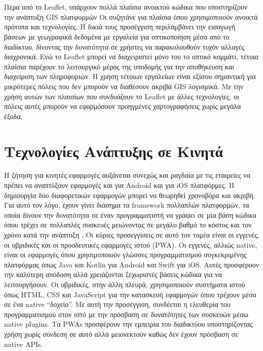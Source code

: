 \\
\\
Πέρα από το Leaflet, υπάρχουν πολλά πλαίσια ανοικτού κώδικα που υποστηρίζουν την ανάπτυξη GIS πλατφορμών Οι \textcite{sejati2020open} συζητάνε για πλαίσια όπου χρησιμοποιούν ανοικτά πρότυπα και τεχνολογίες. Η δικιά τους προσέγγιση περιλαμβάνει την εισαγωγή βάσεων με γεωγραφικά δεδομένα με εργαλεία για οπτικοποίηση μέσα από το διαδίκτυο, δίνοντας την δυνατότητα σε χρήστες να παρακολουθούν τυχόν αλλαγές διαχρονικά. Ενώ το Leaflet μπορεί να διαχειριστεί μόνο του το οπτικό κομμάτι, τέτοια πλαίσια παρέχουν το λειτουργικό μέρος της υποδομής για την αποθήκευση και διαχείριση των πληροφοριών. Η χρήση τέτοιων εργαλείων είναι εξίσου σημαντική για μικρότερες πόλεις που δεν μπορούν να διαθέσουν ακριβά GIS λογισμικά. Με την χρήση αυτών των πλαισίων που συνδυάζουν το Leaflet με άλλες τεχνολογίες, οι πόλεις αυτές μπορούν να εφαρμόσουν προηγμένες χαρτογραφήσεις χωρίς μεγάλα έξοδα.
\\
\section{Τεχνολογίες Ανάπτυξης σε Κινητά}
Η ζήτηση για κινητές εφαρμογές αυξάνεται συνεχώς και ραγδαία με τις εταιρείες να πρέπει να αναπτύξουν εφαρμογές και για Android και για iOS πλατφόρμες. Η δημιουργία δύο διαφορετικών εφαρμογών μπορεί να θεωρηθεί χρονοβόρα και ακριβή. Για αυτό τον λόγο, έχουν γίνει διάσημα τα framework πολλαπλών πλατφορμών, τα οποία δίνουν την δυνατότητα σε έναν προγραμματιστή να γράψει σε μία βάση κώδικα όπου τρέχει σε πολλαπλές συσκευές μειώνοντας σε μεγάλο βαθμό το κόστος και τον χρόνο κατά την ανάπτυξη \parencite{majchrzak2017comprehensive}. Οι κύριες προσεγγίσεις σε αυτό τον τομέα είναι οι εγγενές, οι υβριδικές και οι προοδευτικές εφαρμογές ιστού (PWA). Οι εγγενές, αλλιώς native, είναι οι εφαρμογές όπου χρησιμοποιούν γλώσσες προγραμματισμού συγκεκριμένης πλατφόρμας όπως Java και Kotlin για Android και Swift για iOS. Αυτές προσφέρουν την καλύτερη απόδοση αλλά χρειάζονται ξεχωριστές βάσεις κώδικα για να λειτουργήσουν. Οι υβριδικές, στην άλλη πλευρά, χρησιμοποιούν συστήματα ιστού όπως HTML, CSS και JavaScript για την κατασκευή εφαρμογών όπου τρέχουν μέσα σε ένα native “δοχείο”. Με αυτή την προσέγγιση, συνδέεται η ελευθερία του προγραμματισμού στον ιστό με την πρόσβαση σε δυνατότητες των συσκευών μέσω native plugins. Τα PWAs προσφέρουν την εμπειρία του διαδικτύου υποστηρίζοντας χρήση χωρίς σύνδεση σε αυτό αλλά μειονεκτούν καθώς δεν έχουν πρόσβαση σε native APIs.
\\
